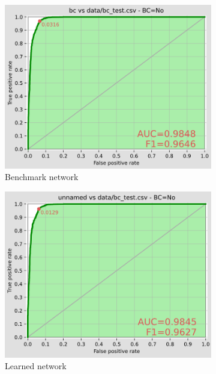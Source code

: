 \documentclass{article}
\begin{document}
\begin{figure}[H]
\begin{subfigure}{0.3\textwidth}
    \centering
    \includegraphics[width=\linewidth]{../figures/roc_original.png}
    \caption{Benchmark network}
    \label{fig:subfig1}
\end{subfigure}
\hfill
\begin{subfigure}{0.3\textwidth}
    \centering
    \includegraphics[width=\linewidth]{../figures/roc_learned.png}
    \caption{Learned network}
    \label{fig:subfig2}
\end{subfigure}
\hfill
\begin{subfigure}{0.3\textwidth}

\end{subfigure}
\end{figure}
\end{document}
